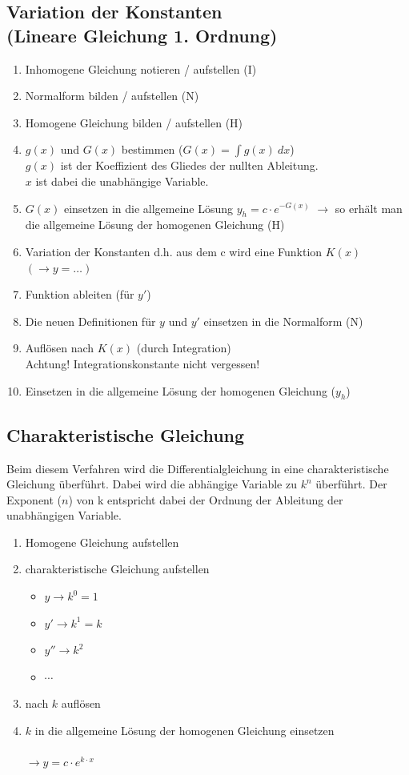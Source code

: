\subsection{Variation der Konstanten \\(Lineare Gleichung 1. Ordnung)}
\begin{enumerate}
  \item Inhomogene Gleichung notieren / aufstellen (I)
  \item Normalform bilden / aufstellen (N)
  \item Homogene Gleichung bilden / aufstellen (H)
  \item $g(x)$ und $G(x)$ bestimmen ($G(x) = \int g(x) ~ dx$) \\
        $g(x)$ ist der Koeffizient des Gliedes der nullten Ableitung. \\
        $x$ ist dabei die unabhängige Variable. 
  \item $G(x)$ einsetzen in die allgemeine Lösung $y_h=c \cdot e^{-G(x)}$
        $\rightarrow$ so erhält man die allgemeine Lösung der 
        homogenen Gleichung (H)
  \item Variation der Konstanten d.h. aus dem c wird eine Funktion $K(x)$ 
        $(\rightarrow y= \ldots)$
  \item Funktion ableiten (für $y'$)
  \item Die neuen Definitionen für $y$ und $y'$ einsetzen in die Normalform (N) 
  \item Auflösen nach $K(x)$ (durch Integration) \\
        Achtung! Integrationskonstante nicht vergessen! 
  \item Einsetzen in die allgemeine Lösung der homogenen Gleichung ($y_h$)
\end{enumerate}

\subsection{Charakteristische Gleichung}
Beim diesem Verfahren wird die Differentialgleichung in eine charakteristische 
Gleichung überführt. Dabei wird die abhängige Variable zu $k^{n}$ überführt. 
Der Exponent ($n$) von k entspricht dabei der Ordnung der Ableitung der 
unabhängigen Variable. 
\begin{enumerate}
  \item Homogene Gleichung aufstellen
  \item charakteristische Gleichung aufstellen
    \begin{itemize}
      \item $y \rightarrow k^0 = 1$
      \item $y' \rightarrow k^1 = k$
      \item $y'' \rightarrow k^2$
      \item $\cdots$
    \end{itemize}
  \item nach $k$ auflösen
  \item $k$ in die allgemeine Lösung der homogenen Gleichung einsetzen\\\\
        $\rightarrow y = c \cdot e^{k \cdot x}$
\end{enumerate}

